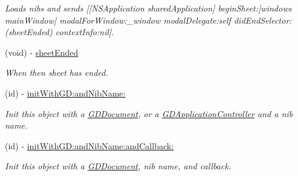 \begin{DoxyCompactItemize}
\begin{DoxyCompactList}\small\item\em Loads nibs and sends \mbox{[}\mbox{[}NSApplication sharedApplication\mbox{]} beginSheet:\mbox{[}windows mainWindow\mbox{]} modalForWindow:\_\-window modalDelegate:self didEndSelector:(sheetEnded) contextInfo:nil\mbox{]}. \item\end{DoxyCompactList}\item 
\hypertarget{interface_g_d_external_nib_controller_a6341c0d960fa2ba117df3f844c277d85}{
(void) -\/ \hyperlink{interface_g_d_external_nib_controller_a6341c0d960fa2ba117df3f844c277d85}{sheetEnded}}
\label{interface_g_d_external_nib_controller_a6341c0d960fa2ba117df3f844c277d85}

\begin{DoxyCompactList}\small\item\em When then sheet has ended. \item\end{DoxyCompactList}\item 
(id) -\/ \hyperlink{interface_g_d_external_nib_controller_aa8f4b18ce32d633eaa55944b497161f3}{initWithGD:andNibName:}
\begin{DoxyCompactList}\small\item\em Init this object with a \hyperlink{interface_g_d_document}{GDDocument}, or a \hyperlink{interface_g_d_application_controller}{GDApplicationController} and a nib name. \item\end{DoxyCompactList}\item 
(id) -\/ \hyperlink{interface_g_d_external_nib_controller_a404eb67212e861a74c1a3cc254489663}{initWithGD:andNibName:andCallback:}
\begin{DoxyCompactList}\small\item\em Init this object with a \hyperlink{interface_g_d_document}{GDDocument}, nib name, and callback. \item\end{DoxyCompactList}\end{DoxyCompactItemize}
